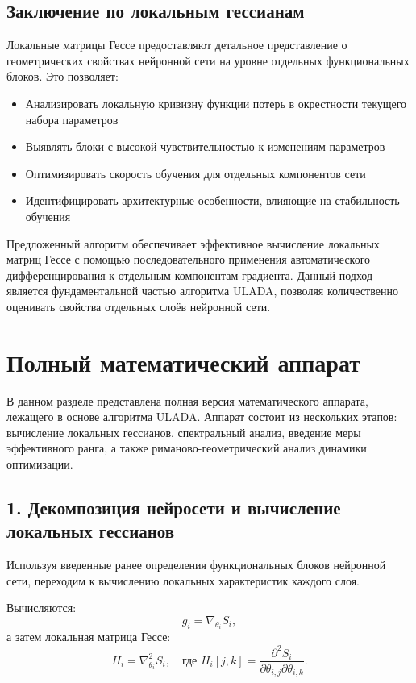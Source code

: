 \documentclass[a4paper,12pt]{article}
\begin{document}
\subsection{Заключение по локальным гессианам}

Локальные матрицы Гессе предоставляют детальное представление о геометрических свойствах нейронной сети на уровне отдельных функциональных блоков. Это позволяет:

\begin{itemize}
\item Анализировать локальную кривизну функции потерь в окрестности текущего набора параметров
\item Выявлять блоки с высокой чувствительностью к изменениям параметров
\item Оптимизировать скорость обучения для отдельных компонентов сети
\item Идентифицировать архитектурные особенности, влияющие на стабильность обучения
\end{itemize}

Предложенный алгоритм обеспечивает эффективное вычисление локальных матриц Гессе с помощью последовательного применения автоматического дифференцирования к отдельным компонентам градиента. Данный подход является фундаментальной частью алгоритма ULADA, позволяя количественно оценивать свойства отдельных слоёв нейронной сети.

\bigskip

\section{Полный математический аппарат}

В данном разделе представлена полная версия математического аппарата, лежащего в основе алгоритма ULADA. Аппарат состоит из нескольких этапов: вычисление локальных гессианов, спектральный анализ, введение меры эффективного ранга, а также риманово-геометрический анализ динамики оптимизации.

\subsection*{1. Декомпозиция нейросети и вычисление локальных гессианов}

Используя введенные ранее определения функциональных блоков нейронной сети, переходим к вычислению локальных характеристик каждого слоя.

Вычисляются:
\begin{equation}
    g_i = \nabla_{\theta_i} S_i,
\end{equation}
а затем локальная матрица Гессе:
\begin{equation}
    H_i = \nabla^2_{\theta_i} S_i, \quad \text{где } H_i[j,k] = \frac{\partial^2 S_i}{\partial \theta_{i,j}\partial \theta_{i,k}}.
\end{equation}
\end{document}
